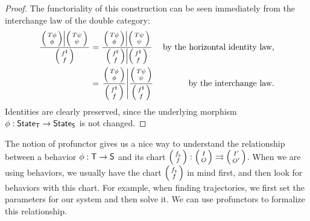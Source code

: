 \documentclass[DynamicalBook]{subfiles}
\begin{document}
\begin{proof}
  The functoriality of this construction can be seen immediately from the
  interchange law of the double category:
  \begin{align*}
  \frac{\left.\littlelens{T\phi}{\phi} \middle| \littlelens{T\psi}{\psi} \right. }{\littlelens{f^{\sharp}}{f}} &= \frac{\left.\littlelens{T\phi }{\phi} \middle| \littlelens{T\psi
    }{\psi} \right. }{\left. \littlelens{f^{\sharp}}{f} \middle| \littlelens{f^{\sharp}}{f} \right.} &\mbox{by the horizontal identity law,}\\
    &= \left.
      \frac{\littlelens{T\phi }{\phi}}{\littlelens{f^{\sharp}}{f}}
      \middle|\frac{\littlelens{T\psi}{\psi}}{\littlelens{f^{\sharp}}{f}} \right. &\mbox{by the interchange law.}
  \end{align*}
  Identities are clearly preserved, since the underlying morphism $\phi :
  \mathsf{State}_{\mathsf{T}} \to \mathsf{State}_{\mathsf{S}}$ is not changed. 
\end{proof}


  The notion of profunctor gives us a nice way to understand the relationship
  between a behavior $\phi : \mathsf{T} \to \mathsf{S}$ and its chart
  $\lens{f_{\flat}}{f} : \lens{I}{O} \tto \lens{I'}{O'}$. When we are using
  behaviors, we usually have the chart $\lens{f_{\flat}}{f}$ in mind first, and
  then look for behaviors with this chart. For example, when finding
  trajectories, we first set the parameters for our system and then solve it. We
  can use profunctors to formalize this relationship.
\end{document}
